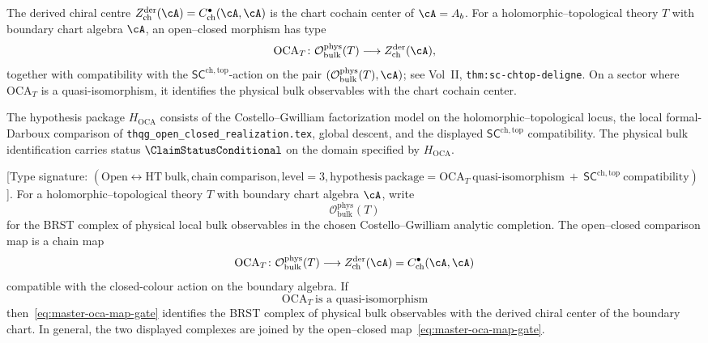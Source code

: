 \begin{convention}
\label{conv:master-oca}
The derived chiral centre $Z^{\mathrm{der}}_{\mathrm{ch}}(\cA)
= C^\bullet_{\mathrm{ch}}(\cA,\cA)$ is the chart cochain center of
$\cA=A_b$.  For a holomorphic--topological theory $T$ with boundary
chart algebra $\cA$, an open--closed morphism has type
\[
\mathrm{OCA}_T\colon
\mathcal{O}^{\mathrm{phys}}_{\mathrm{bulk}}(T)
\longrightarrow
Z^{\mathrm{der}}_{\mathrm{ch}}(\cA),
\]
together with compatibility with the
$\mathsf{SC}^{\mathrm{ch,top}}$-action on the pair
$(\mathcal{O}^{\mathrm{phys}}_{\mathrm{bulk}}(T),\cA)$; see Vol~II,
\texttt{thm:sc-chtop-deligne}.  On a sector where
$\mathrm{OCA}_T$ is a quasi-isomorphism, it identifies the physical
bulk observables with the chart cochain center.

The hypothesis package $H_{\mathrm{OCA}}$ consists of the
Costello--Gwilliam factorization model on the
holomorphic--topological locus, the local formal-Darboux comparison of
\texttt{thqg\_open\_closed\_realization.tex}, global descent, and the
displayed $\mathsf{SC}^{\mathrm{ch,top}}$ compatibility.  The physical
bulk identification carries status $\ClaimStatusConditional$ on the
domain specified by $H_{\mathrm{OCA}}$.
\end{convention}

\begin{proposition}
\label{prop:master-oca-holography-gate}
\textup{[}Type signature:
$(\mathrm{Open}\leftrightarrow\mathrm{HT\ bulk},
\mathrm{chain\ comparison},\mathrm{level}=3,
\mathrm{hypothesis\ package}=\mathrm{OCA}_T
\ \mathrm{quasi\text{-}isomorphism}
\ +\ \mathsf{SC}^{\mathrm{ch,top}}\mathrm{\ compatibility})$
\textup{].}
For a holomorphic--topological theory $T$ with boundary chart algebra
$\cA$, write
\[
\mathcal O^{\mathrm{phys}}_{\mathrm{bulk}}(T)
\]
for the BRST complex of physical local bulk observables in the chosen
Costello--Gwilliam analytic completion.  The open--closed comparison
map is a chain map
\begin{equation}
\label{eq:master-oca-map-gate}
\mathrm{OCA}_T\colon
\mathcal O^{\mathrm{phys}}_{\mathrm{bulk}}(T)
\longrightarrow
Z^{\mathrm{der}}_{\mathrm{ch}}(\cA)
=C^\bullet_{\mathrm{ch}}(\cA,\cA)
\end{equation}
compatible with the closed-colour action on the boundary algebra.
If
\begin{equation}
\label{eq:master-oca-quasi-isomorphism-gate}
\mathrm{OCA}_T\ \text{is a quasi-isomorphism}
\end{equation}
then~\eqref{eq:master-oca-map-gate} identifies the BRST complex of
physical bulk observables with the derived chiral center of the
boundary chart.  In general, the two displayed complexes are joined by
the open--closed map~\eqref{eq:master-oca-map-gate}.
\end{proposition}


